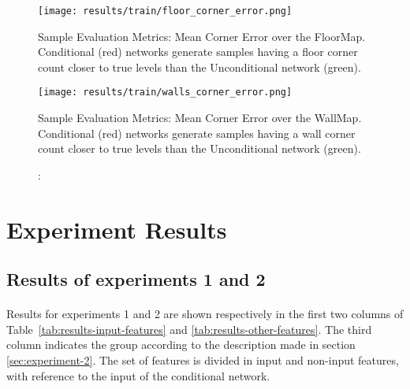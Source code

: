 \begin{figure}[!htb] 
	\begin{minipage}[b]{\linewidth}
		\centering
		\texttt{[image: results/train/floor\_corner\_error.png]} 
		\caption[Sample Evaluation Metrics: Mean Corner Error (FloorMap)]: {Sample Evaluation Metrics: Mean Corner Error over the FloorMap. Conditional (red) networks generate samples having a floor corner count closer to true levels than the Unconditional network (green).}
		\label{fig:floor_corner_error}
	\end{minipage}

	\begin{minipage}[b]{\linewidth}
		\centering
		\texttt{[image: results/train/walls\_corner\_error.png]} 
		\caption[Sample Evaluation Metrics: Mean Corner Error (WallMap)]: {Sample Evaluation Metrics: Mean Corner Error over the WallMap. Conditional (red) networks generate samples having a wall corner count closer to true levels than the Unconditional network (green).}
		\label{fig:wall_corner_error}
	\end{minipage}
\end{figure}


\FloatBarrier
\section{Experiment Results}
\paragraph{}
\subsection{Results of experiments 1 and 2}
\paragraph{} Results for experiments 1 and 2 are shown respectively in the first two columns of Table~\ref{tab:results-input-features} and \ref{tab:results-other-features}. The third column indicates the group according to the description made in section \ref{sec:experiment-2}. The set of features is divided in input and non-input features, with reference to the input of the conditional network.
	
